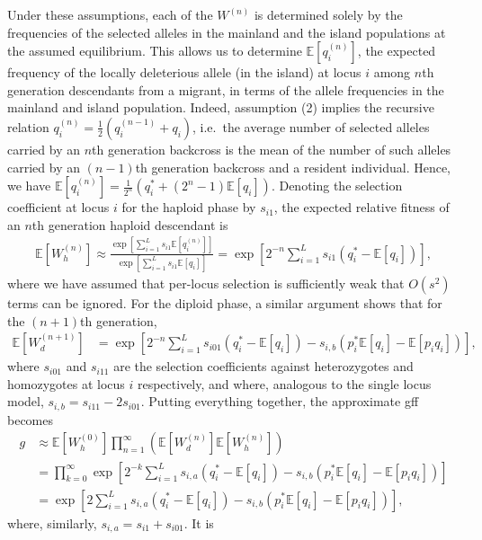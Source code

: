 \documentclass[
  11pt,
]{article}
\begin{document}
Under these assumptions, each of the \(W^{(n)}\) is determined solely by
the frequencies of the selected alleles in the mainland and the island
populations at the assumed equilibrium. This allows us to determine
\(\mathbb{E}[q_i^{(n)}]\), the expected frequency of the locally
deleterious allele (in the island) at locus \(i\) among \(n\)th
generation descendants from a migrant, in terms of the allele
frequencies in the mainland and island population. Indeed, assumption
(2) implies the recursive relation
\(q_{i}^{(n)} = \frac{1}{2}(q_i^{(n-1)} + q_i)\), i.e.~the average
number of selected alleles carried by an \(n\)th generation backcross is
the mean of the number of such alleles carried by an \((n-1)\)th
generation backcross and a resident individual. Hence, we have
\(\mathbb{E}[q_i^{(n)}] = \frac{1}{2^n}(q_i^\ast + (2^n - 1)\mathbb{E}[q_i])\).
Denoting the selection coefficient at locus \(i\) for the haploid phase
by \(s_{i1}\), the expected relative fitness of an \(n\)th generation
haploid descendant is \begin{align*}
\mathbb{E}\left[W_h^{(n)}\right] \approx \frac{\exp\left[\sum_{i=1}^L s_{i1}\mathbb{E}[q_i^{(n)}]\right]}
                          {\exp\left[\sum_{i=1}^L s_{i1}\mathbb{E}[q_i]\right]} 
  = \exp\left[2^{-n}\sum_{i=1}^L s_{i1}(q_i^\ast - \mathbb{E}[q_i])\right],
\end{align*} where we have assumed that per-locus selection is
sufficiently weak that \(O(s^2)\) terms can be ignored. For the diploid
phase, a similar argument shows that for the \((n+1)\)th generation,
\begin{align*}
\mathbb{E}\left[W_d^{(n+1)}\right] 
  &= \exp\left[2^{-n}\sum_{i=1}^L s_{i01}(q_i^\ast - \mathbb{E}[q_i]) 
    - s_{i,b}(p_i^\ast\mathbb{E}[q_i] - \mathbb{E}[p_iq_i])\right],
\end{align*} where \(s_{i01}\) and \(s_{i11}\) are the selection
coefficients against heterozygotes and homozygotes at locus \(i\)
respectively, and where, analogous to the single locus model,
\(s_{i,b} = s_{i11} - 2s_{i01}\). Putting everything together, the
approximate gff becomes \begin{align}
g 
 &\approx \mathbb{E}\left[W_h^{(0)}\right]\prod_{n=1}^\infty 
    \left(\mathbb{E}\left[W_d^{(n)}\right] \mathbb{E}\left[W_h^{(n)}\right]\right)
 \nonumber \\
 &=\prod_{k=0}^\infty \exp\left[ 
    2^{-k}\sum_{i=1}^L s_{i,a}(q_i^\ast - \mathbb{E}[q_i]) - 
    s_{i,b}(p_i^\ast \mathbb{E}[q_i] - \mathbb{E}[p_iq_i])\right] \nonumber \\
&=\exp\left[2\sum_{i=1}^L 
    s_{i,a}(q_i^\ast - \mathbb{E}[q_i]) - s_{i,b}(p_i^\ast\mathbb{E}[q_i] -
    \mathbb{E}[p_iq_i])\right],
    \label{eq:gff}
\end{align} where, similarly, \(s_{i,a} = s_{i1} + s_{i01}\). It is
\end{document}
